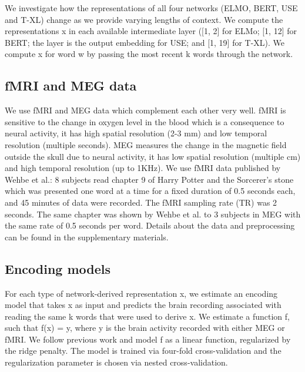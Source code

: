 \documentclass{article}
\begin{document}
We investigate how the representations of all four networks (ELMO, BERT, USE and T-XL) change as we provide varying lengths of context. We compute the representations x in each available intermediate layer ([1, 2] for ELMo; [1, 12] for BERT; the layer is the output embedding for USE; and [1, 19] for T-XL). We compute x for word w by passing the most recent k words through the network.

\subsection{fMRI and MEG data} 
We use fMRI and MEG data which complement each other very well. fMRI is sensitive to the change in oxygen level in the blood which is a consequence to neural activity, it has high spatial resolution (2-3 mm) and low temporal resolution (multiple seconds). MEG measures the change in the magnetic field outside the skull due to neural activity, it has low spatial resolution (multiple cm) and high temporal resolution (up to 1KHz). We use fMRI data published by Wehbe et al.\cite{wehbe2014simultaneously}: 8 subjects read chapter 9 of Harry Potter and the Sorcerer’s stone\cite{rowling2012harry} which was presented one word at a time for a fixed duration of 0.5 seconds each, and 45 minutes of data were recorded. The fMRI sampling rate (TR) was 2 seconds. The same chapter was shown by Wehbe et al.\cite{wehbe2014aligning} to 3 subjects in MEG with the same rate of 0.5 seconds per word. Details about the data and preprocessing can be found in the supplementary materials.

\subsection{Encoding models} 
For each type of network-derived representation x, we estimate an encoding model that takes x as input and predicts the brain recording associated with reading the same k words that were used to derive x. We estimate a function f, such that f(x) = y, where y is the brain activity recorded with either MEG or fMRI. We follow previous work\cite{wehbe2014simultaneously} and model f as a linear function, regularized by the ridge penalty. The model is trained via four-fold cross-validation and the regularization parameter is chosen via nested cross-validation.
\end{document}
